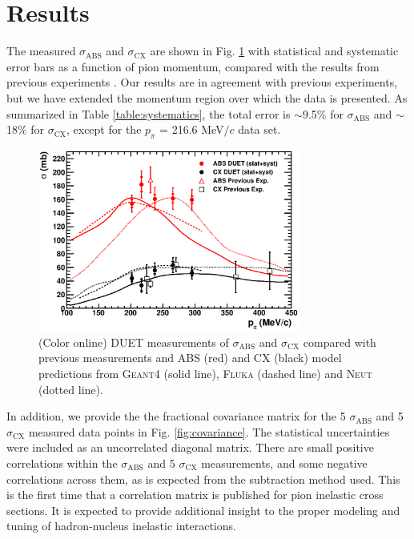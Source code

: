 \section{Results}\label{sec:result}
The measured $\sigma_{\mathrm{ABS}}$ and $\sigma_{\mathrm{CX}}$ are shown in Fig. \ref{fig:result} with statistical and systematic error bars as a function of pion momentum, compared with the results from previous experiments \cite{Bellotti1973,Ashery2,Bellotti1973_2,Jones}. Our results are in agreement with previous experiments, but we have extended the momentum region over which the data is presented. As summarized in Table \ref{table:systematics}, the total error is $\sim$9.5\% for $\sigma_{\mathrm{ABS}}$ and $\sim$18\% for $\sigma_{\mathrm{CX}}$, except for the $p_{\pi}$ = 216.6 MeV$/c$ data set.

\begin{figure}[h]
\begin{center}
\includegraphics[width=86mm]{figures/duet_result_for_sep_paper.eps}
\caption{(Color online) DUET measurements of $\sigma_{\mathrm{ABS}}$ and $\sigma_{\mathrm{CX}}$ compared with previous measurements and ABS (red) and CX (black) model predictions from \textsc{Geant4} (solid line), \textsc{Fluka} (dashed line) and \textsc{Neut} (dotted line).}
\label{fig:result}
\end{center} 
\end{figure}

In addition, we provide the the fractional covariance matrix for the 5 $\sigma_{\mathrm{ABS}}$ and 5 $\sigma_{\mathrm{CX}}$ measured data points in Fig. \ref{fig:covariance}. The statistical uncertainties were included as an uncorrelated diagonal matrix. There are small positive correlations within the $\sigma_{\mathrm{ABS}}$ and 5 $\sigma_{\mathrm{CX}}$ measurements, and some negative correlations across them, as is expected from the subtraction method used. This is the first time that a correlation matrix is published for pion inelastic cross sections. It is expected to provide additional insight to the proper modeling and tuning of hadron-nucleus inelastic interactions.

